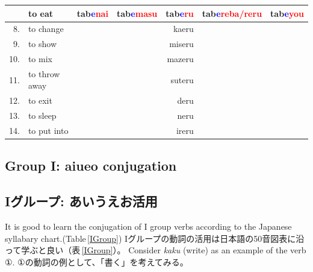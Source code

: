 \documentclass[uplatex,dvipdfmx,b5paper,english,10pt]{jsbook}
\begin{document}
\begin{table}[ht]
\begin{tabular}{rrrrrrr}
    &\multicolumn{1}{l}{to eat}
    & tab\textcolor{blue}{e}\textcolor{red}{nai}
    & tab\textcolor{blue}{e}\textcolor{red}{masu}
    & tab\textcolor{blue}{e}\textcolor{red}{ru}
    & tab\textcolor{blue}{e}\textcolor{red}{reba/reru}
    & tab\textcolor{blue}{e}\textcolor{red}{you}
    \\ \hline
    8. &\multicolumn{1}{l}{to change}    & & & kaeru     & & \\
    9. &\multicolumn{1}{l}{to show}      & & & miseru    & & \\
   10. &\multicolumn{1}{l}{to mix}       & & & mazeru    & & \\
   11. &\multicolumn{1}{l}{to throw away}& & & suteru    & & \\
   12. &\multicolumn{1}{l}{to exit}      & & & deru      & & \\
   13. &\multicolumn{1}{l}{to sleep}     & & & neru      & & \\
   14. &\multicolumn{1}{l}{to put into}  & & & ireru     & & \\

\end{tabular}
\end{table}


\ifEnglish
\subsection*{Group I: aiueo conjugation}
\else
\subsection*{Iグループ: あいうえお活用}
\fi

\ifEnglish
It is good to learn the conjugation of I group verbs according to the Japanese syllabary chart.(Table\,\ref{IGroup})
\else
Iグループの動詞の活用は日本語の50音図表に沿って学ぶと良い（表\,\ref{IGroup}）。
\fi
\ifEnglish
Consider {\it kaku\/} (write) as an example of the verb ①.
\else
①の動詞の例として、「書く」を考えてみる。
\fi
\end{document}
